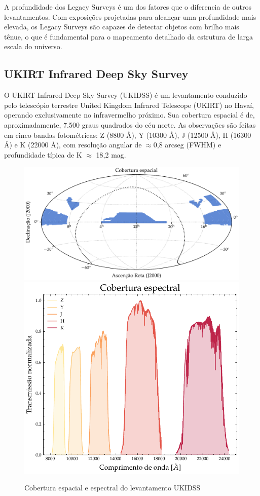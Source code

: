A profundidade dos Legacy Surveys é um dos fatores que o diferencia de outros levantamentos. Com exposições projetadas para alcançar uma profundidade mais elevada, os Legacy Surveys são capazes de detectar objetos com brilho mais tênue, o que é fundamental para o mapeamento detalhado da estrutura de larga escala do universo.









\subsection{UKIRT Infrared Deep Sky Survey}
\label{sec:dados-ukidss}

O UKIRT Infrared Deep Sky Survey (UKIDSS) é um levantamento conduzido pelo telescópio terrestre United Kingdom Infrared Telescope (UKIRT) no Havaí, operando exclusivamente no infravermelho próximo. Sua cobertura espacial é de, aproximadamente, 7.500 graus quadrados do céu norte. As observações são feitas em cinco bandas fotométricas: Z (8800 \AA), Y (10300 \AA), J (12500 \AA), H (16300 \AA) e K (22000 \AA), com resolução angular de $\approx$0,8 arcseg (FWHM) e profundidade típica de K $\approx$ 18,2 mag.

\begin{figure}[!ht]
  \centering
  \caption{Cobertura espacial e espectral do levantamento UKIDSS}
  \label{fig:footprint-ukidss}
  \includegraphics[width=0.61\linewidth]{figures/footprint_ukidss.pdf}\hfill
  \includegraphics[width=0.37\linewidth]{figures/transmission_ukidss.pdf}
\end{figure}






